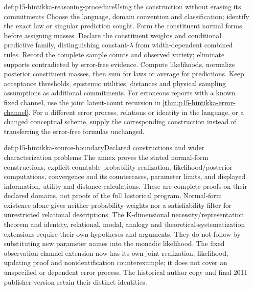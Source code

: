 \begin{hbmethod}{def:p15-hintikka-reasoning-procedure}{Using the construction without erasing its commitments}
Choose the language, domain convention and classification; identify
the exact law or singular prediction sought. Form the constituent normal
forms before assigning masses. Declare the constituent weights and
conditional predictive family, distinguishing constant-\(\lambda\)
from width-dependent combined rules. Record the complete sample counts
and observed variety; eliminate supports contradicted by error-free
evidence. Compute likelihoods, normalize posterior constituent masses,
then sum for laws or average for predictions. Keep acceptance thresholds,
epistemic utilities, distances and physical sampling assumptions as
additional commitments. For erroneous reports with a known fixed channel, use the joint latent-count
recursion in \cref{thm:p15-hintikka-error-channel}. For a different error
process, relations or identity in the language, or a changed conceptual
scheme, supply the corresponding construction instead of transferring
the error-free formulas unchanged.
\end{hbmethod}

\begin{proofboundary}{def:p15-hintikka-source-boundary}{Declared constructions and wider characterization problems}
The annex proves the stated normal-form constructions, explicit countable
probability realization, likelihood/posterior computations, convergence
and its countercases, parameter limits, and displayed information,
utility and distance calculations. These are complete proofs on their
declared domains, not proofs of the full historical program.
Normal-form existence alone gives neither probability weights nor a
satisfiability filter for unrestricted relational descriptions. The
K-dimensional necessity/representation theorem and identity, relational,
modal, analogy and theoretical-systematization extensions require
their own hypotheses and arguments. They do not follow by substituting
new parameter names into the monadic likelihood. The fixed observation-channel extension now has its own joint realization,
likelihood, updating proof and nonidentification counterexample; it does not
cover an unspecified or dependent error process. The historical author copy
and final 2011 publisher version retain their distinct identities.
\end{proofboundary}
